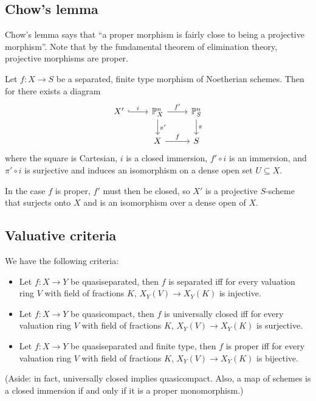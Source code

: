 \documentclass[11pt]{amsart}
\begin{document}
\subsection{Chow's lemma}


Chow's lemma says that ``a proper morphism is fairly close to being a projective morphism''. Note that by the fundamental theorem of elimination theory, projective morphisms are proper. 

\begin{thm}[Chow]
    Let $f: X\to S$ be a separated, finite type morphism of Noetherian schemes. Then for there exists a diagram
    \[
    \begin{tikzcd}
        X' \arrow[r, hook, "i"] & \PP_X^n \arrow[d, "\pi'"] \arrow[r, "f'"] & \PP_S^n \arrow[d, "\pi"] \\
        & X \arrow[r, "f"] & S
    \end{tikzcd}
    \]
    where the square is Cartesian, $i$ is a closed immersion, $f'\circ i$ is an immersion, and $\pi'\circ i$ is surjective and induces an isomorphism on a dense open set $U\subseteq X$.
\end{thm}

In the case $f$ is proper, $f'$ must then be closed, so $X'$ is a projective $S$-scheme that surjects onto $X$ and is an isomorphism over a dense open of $X$.


\subsection{Valuative criteria}


\begin{thm}
We have the following criteria:
   \begin{itemize}
       \item Let $f:X\to Y$ be quasiseparated, then $f$ is separated iff for every valuation ring $V$ with field of fractions $K$, $X_Y(V)\to X_Y(K)$ is injective.
       \item Let $f: X\to Y$ be quasicompact, then $f$ is universally closed iff for every valuation ring $V$ with field of fractions $K$, $X_Y(V)\to X_Y(K)$ is surjective.
       \item Let $f:X\to Y$ be quasiseparated and finite type, then $f$ is proper iff for every valuation ring $V$ with field of fractions $K$, $X_Y(V)\to X_Y(K)$ is bijective.
   \end{itemize} 
\end{thm}

(Aside: in fact, universally closed implies quasicompact. Also, a map of schemes is a closed immersion if and only if it is a proper monomorphism.)
\end{document}

